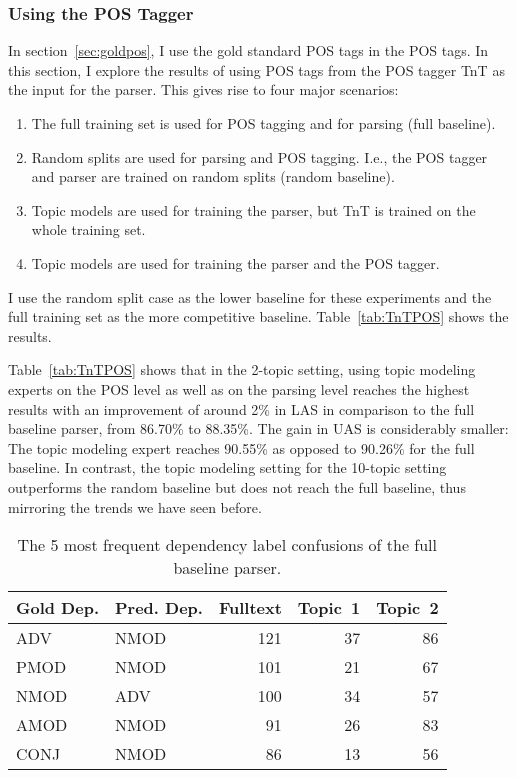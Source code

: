 \subsubsection{Using the POS Tagger}\label{TnTPOSinParsing}

In section~\ref{sec:goldpos}, I use the gold standard POS tags in the POS tags. In this section, I explore the results of using POS tags from the POS tagger TnT as the input for the parser. This gives rise to four major scenarios:

\begin{enumerate}
	\item The full training set is used for POS tagging and for parsing (full baseline).
	\item Random splits are used for parsing and POS tagging. I.e., the POS tagger and parser are trained on random splits (random baseline).
	\item Topic models are used for training the parser, but TnT is trained on the whole training set.\label{S2}
	\item Topic models are used for training the parser and the POS tagger. \label{S1}
\end{enumerate}

I use the random split case as the lower baseline for these experiments and the full training set as the more competitive baseline. Table~\ref{tab:TnTPOS} shows the results.


Table~\ref{tab:TnTPOS}  shows that in the 2-topic setting, using topic modeling experts on the POS level as well as on the parsing level reaches the highest results with an improvement of around 2\% in LAS in comparison to the full baseline parser, from 86.70\% to 88.35\%. The gain in UAS is considerably smaller: The topic modeling expert reaches 90.55\% as opposed to 90.26\% for the full baseline. In contrast, the topic modeling setting for the 10-topic setting outperforms the random baseline but does not reach the full baseline,  thus mirroring the trends we have seen before.

\begin{table*}[t!]
\centering
\begin{tabular}{ll|rrr}

Gold Dep. & Pred. Dep. & Fulltext  &Topic~1  & Topic~2 \\ \hline
ADV & NMOD & 121 & 37 & 86\\
PMOD & NMOD & 101 & 21& 67\\
NMOD & ADV & 100 & 34 & 57 \\
AMOD & NMOD & 91 & 26 & 83\\
CONJ & NMOD & 86 & 13 & 56\\ \hline
\end{tabular}
\caption{The 5 most frequent dependency label confusions of the full baseline parser.}
\label{tab:conf:FT:TM}
\end{table*}

